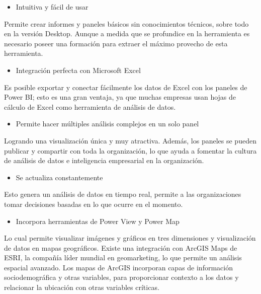 \documentclass[
]{book}
\providecommand{\tightlist}{%
  \setlength{\itemsep}{0pt}\setlength{\parskip}{0pt}}
\begin{document}
\begin{itemize}
\tightlist
\item
  Intuitiva y fácil de usar
\end{itemize}

Permite crear informes y paneles básicos sin conocimientos técnicos, sobre todo en la versión Desktop. Aunque a medida que se profundice en la herramienta es necesario poseer una formación para extraer el máximo provecho de esta herramienta.

\begin{itemize}
\tightlist
\item
  Integración perfecta con Microsoft Excel
\end{itemize}

Es posible exportar y conectar fácilmente los datos de Excel con los paneles de Power BI; esto es una gran ventaja, ya que muchas empresas usan hojas de cálculo de Excel como herramienta de análisis de datos.

\begin{itemize}
\tightlist
\item
  Permite hacer múltiples análisis complejos en un solo panel
\end{itemize}

Logrando una visualización única y muy atractiva. Además, los paneles se pueden publicar y compartir con toda la organización, lo que ayuda a fomentar la cultura de análisis de datos e inteligencia empresarial en la organización.

\begin{itemize}
\tightlist
\item
  Se actualiza constantemente
\end{itemize}

Esto genera un análisis de datos en tiempo real, permite a las organizaciones tomar decisiones basadas en lo que ocurre en el momento.

\begin{itemize}
\tightlist
\item
  Incorpora herramientas de Power View y Power Map
\end{itemize}

Lo cual permite visualizar imágenes y gráficos en tres dimensiones y visualización de datos en mapas geográficos. Existe una integración con ArcGIS Maps de ESRI, la compañía líder mundial en geomarketing, lo que permite un análisis espacial avanzado. Los mapas de ArcGIS incorporan capas de información sociodemográfica y otras variables, para proporcionar contexto a los datos y relacionar la ubicación con otras variables críticas.
\end{document}
